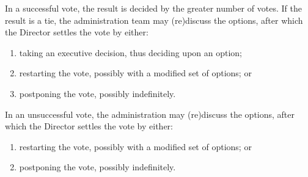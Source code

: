 \begin{enumerate}
    \begin{item}
        In a successful vote, the result is decided by the greater number of votes. If the result is a tie, the administration team may (re)discuss the options, after which the Director settles the vote by either:
        \begin{enumerate}
            \item taking an executive decision, thus deciding upon an option;
            \item restarting the vote, possibly with a modified set of options; or
            \item postponing the vote, possibly indefinitely.
        \end{enumerate}
    \end{item}

    \begin{item}
        In an unsuccessful vote, the administration may (re)discuss the options, after which the Director settles the vote by either:
        \begin{enumerate}
            \item restarting the vote, possibly with a modified set of options; or
            \item postponing the vote, possibly indefinitely.
        \end{enumerate}
    \end{item}

\end{enumerate}
